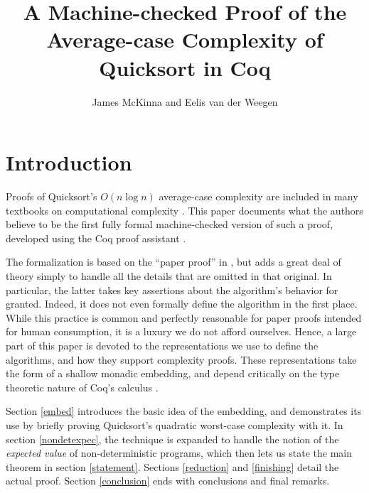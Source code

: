 \documentclass[runningheads]{llncs}
\newcommand{\theauthors}{James McKinna and Eelis van der Weegen}
\newcommand{\thetitle}{A Machine-checked Proof of the Average-case Complexity of Quicksort in Coq}
\newcommand{\todo}[1]{\textcolor{magenta}{[TODO: #1]}}
\begin{document}
\nocite{*}

\title{\thetitle}

\authorrunning{\em}
\titlerunning{\em}

\author{\theauthors}


\maketitle

\begin{abstract}
  
\end{abstract}

\section{Introduction}

Proofs of Quicksort's $O(n \log n)$ average-case complexity are included in many textbooks on computational complexity \cite[for example, which we followed in this course of this research]{introtoalgos}. %
This paper documents what the authors believe to be the first fully formal machine-checked version of such a proof, developed using the Coq proof assistant \cite{coq}.

The formalization is based on the ``paper proof'' in \cite{introtoalgos}, but adds a great deal of theory simply to handle all the details that are omitted in that original. In particular, the latter takes key assertions about the algorithm's behavior for granted. Indeed, it does not even formally define the algorithm in the first place. While this practice is common and perfectly reasonable for paper proofs intended for human consumption, it is a luxury we do not afford ourselves. Hence, a large part of this paper is devoted to the representations we use to define the algorithms, and how they support complexity proofs. These representations take the form of a shallow monadic embedding, and depend critically on the type theoretic nature of Coq's calculus \cite{coq'art}.

Section \ref{embed} introduces the basic idea of the embedding, and demonstrates its use by briefly proving Quicksort's quadratic worst-case complexity with it. In section \ref{nondetexpec}, the technique is expanded to handle the notion of the \emph{expected value} of non-deterministic programs, which then lets us state the main theorem in section \ref{statement}. Sections \ref{reduction} and \ref{finishing} detail the actual proof. Section \ref{conclusion} ends with conclusions and final remarks.
\end{document}
